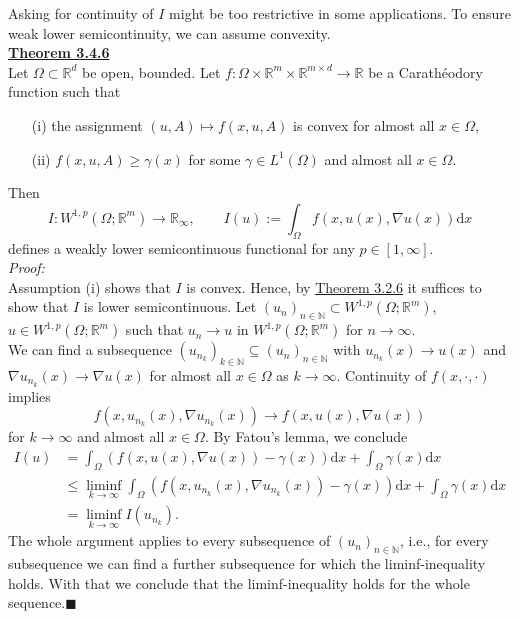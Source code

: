 Asking for continuity of $I$ might be too restrictive in some applications. To ensure weak lower semicontinuity, we can assume convexity.\\

\hypertarget{theorem_3_4_6}{\textbf{\underline{Theorem 3.4.6}}}\\
Let $\Omega\subset\mathbb{R}^d$ be open, bounded. Let $f:\Omega\times\mathbb{R}^m\times\mathbb{R}^{m\times d}\longrightarrow\mathbb{R}$ be a Carath\'eodory function such that
\begin{itemize}
	\item[(i)] the assignment $(u,A)\longmapsto f(x,u,A)$ is convex for almost all $x\in\Omega$,
	\item[(ii)] $f(x,u,A)\geq\gamma(x)$ for some $\gamma\in L^1(\Omega)$ and almost all $x\in\Omega$.
\end{itemize}
Then
\[I:W^{1,p}(\Omega;\mathbb{R}^m)\longrightarrow\mathbb{R}_\infty,\qquad I(u):=\int_\Omega{f(x,u(x),\nabla u(x))\mathrm{d}x}\]
defines a weakly lower semicontinuous functional for any $p\in[1,\infty]$.\\

\textit{Proof:}\\
Assumption (i) shows that $I$ is convex. Hence, by \hyperlink{theorem_3_2_6}{Theorem 3.2.6} it suffices to show that $I$ is lower semicontinuous. Let $(u_n)_{n\in\mathbb{N}}\subset W^{1,p}(\Omega;\mathbb{R}^m)$, $u\in W^{1,p}(\Omega;\mathbb{R}^m)$ such that $u_n\to u$ in $W^{1,p}(\Omega;\mathbb{R}^m)$ for $n\to\infty$.\\

We can find a subsequence $(u_{n_k})_{k\in\mathbb{N}}\subseteq(u_n)_{n\in\mathbb{N}}$ with $u_{n_k}(x)\to u(x)$ and $\nabla u_{n_k}(x)\to\nabla u(x)$ for almost all $x\in\Omega$ as $k\to\infty$. Continuity of $f(x,\cdot,\cdot)$ implies
\[f(x,u_{n_k}(x),\nabla u_{n_k}(x))\to f(x,u(x),\nabla u(x))\]
for $k\to\infty$ and almost all $x\in\Omega$. By Fatou's lemma, we conclude
\begin{align*}
	I(u)&=\int_\Omega{(f(x,u(x),\nabla u(x))-\gamma(x))\mathrm{d}x}+\int_\Omega{\gamma(x)\mathrm{d}x}\\
	&\leq\liminf_{k\to\infty}{\int_\Omega{(f(x,u_{n_k}(x),\nabla u_{n_k}(x))-\gamma(x))}\mathrm{d}x}+\int_\Omega{\gamma(x)\mathrm{d}x}\\
	&=\liminf_{k\to\infty}{I(u_{n_k})}.
\end{align*}
The whole argument applies to every subsequence of $(u_n)_{n\in\mathbb{N}}$, i.e., for every subsequence we can find a further subsequence for which the liminf-inequality holds. With that we conclude that the liminf-inequality holds for the whole sequence.\hfill$\blacksquare$\\[11pt]

